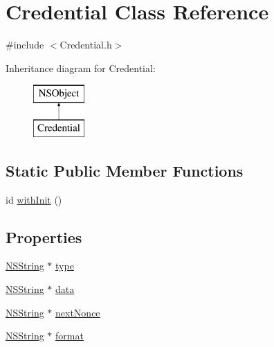 \hypertarget{interface_credential}{
\section{\-Credential \-Class \-Reference}
\label{interface_credential}
}


{\ttfamily \#include $<$\-Credential.\-h$>$}

\-Inheritance diagram for \-Credential\-:\begin{figure}[H]
\begin{center}
\leavevmode
\includegraphics[height=2.000000cm]{interface_credential}
\end{center}
\end{figure}
\subsection*{\-Static \-Public \-Member \-Functions}
\begin{DoxyCompactItemize}
\item 
id \hyperlink{interface_credential_a79510e67087c0cfb041d871d0a32ca4f}{with\-Init} ()
\end{DoxyCompactItemize}
\subsection*{\-Properties}
\begin{DoxyCompactItemize}
\item 
\hyperlink{class_n_s_string}{\-N\-S\-String} $\ast$ \hyperlink{interface_credential_a546016ff2be0b8dc44e4ee82c52b5402}{type}
\item 
\hyperlink{class_n_s_string}{\-N\-S\-String} $\ast$ \hyperlink{interface_credential_ac50e1dfa9c8939fd34b9492ddde18255}{data}
\item 
\hyperlink{class_n_s_string}{\-N\-S\-String} $\ast$ \hyperlink{interface_credential_a8a81638fcab7c1d2a61dba4d1f8fdbb8}{next\-Nonce}
\item 
\hyperlink{class_n_s_string}{\-N\-S\-String} $\ast$ \hyperlink{interface_credential_a5fa39aa62f0e03e78cf094a32c3afac9}{format}
\end{DoxyCompactItemize}


